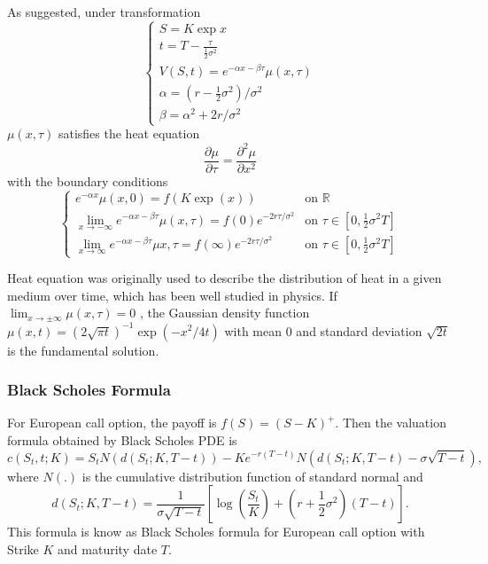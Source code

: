 \documentclass[12pt,oneside,titlepage]{book}
\def\bR{{\mathbb{R}}}
\begin{document}
As suggested, under transformation
\begin{equation}
\begin{cases}
S=K\exp{x} \\
t=T-\frac{\tau}{\frac{1}{2}\sigma ^2} \\
V(S,t)=e^{-\alpha x - \beta \tau } \mu(x, \tau)\\
\alpha=(r-\frac{1}{2} \sigma ^2) / \sigma ^2 \\
\beta= \alpha ^2 + 2r/{\sigma}^2
\end{cases}
\end{equation}
$\mu(x,\tau)$ satisfies the heat equation
\begin{equation}
\frac{\partial \mu}{\partial \tau} = \frac{\partial ^2 \mu}{\partial x^2}
\end{equation}
with the boundary conditions
\begin{equation}
\begin{cases}
e^{-\alpha x} \mu (x,0) = f(K \exp(x)) & \text{on } \bR \\
\displaystyle \lim_{x \to -\infty}e^{-\alpha x- \beta \tau } \mu(x,\tau) = f(0)e^{-2r\tau / \sigma ^2} &\text{on } \tau \in [0,\frac{1}{2}\sigma ^2 T] \\
\displaystyle \lim_{x \to \infty} e^{-\alpha x -\beta \tau } \mu{x,\tau}  = f(\infty) e^{-2r\tau / \sigma ^2} & \text{on } \tau \in [0, \frac{1}{2} \sigma ^2 T]
\end{cases}
\end{equation}

Heat equation was originally used to describe the distribution of heat in a given medium over time, which has been well studied in physics. If $\lim_{x\to \pm \infty} \mu (x, \tau)= 0$ , the Gaussian density function $\mu (x,t) = (2 \sqrt{\pi t} )^{-1} \exp(-x^2 /{4t})$ with mean $0$ and standard deviation $\sqrt {2t} $ is the fundamental solution.

\subsubsection{Black Scholes Formula}
For European call option, the payoff is $f(S)=(S-K)^+$. Then the valuation formula obtained by Black Scholes PDE is
\begin{equation}
c(S_t,t;K)=S_t N(d(S_t;K,T-t))-Ke^{-r(T-t)}N(d(S_t;K,T-t)-\sigma\sqrt{T-t}),
\end{equation}
where $N(.)$ is the cumulative distribution function of standard normal and
\begin{equation}
d(S_t;K,T-t)=\frac{1}{\sigma \sqrt{T-t}} [\log(\frac{S_t}{K}) + (r+\frac{1}{2}\sigma ^2)(T-t)].
\end{equation}
This formula is know as Black Scholes formula for European call option with Strike $K$ and maturity date $T$.
\end{document}
